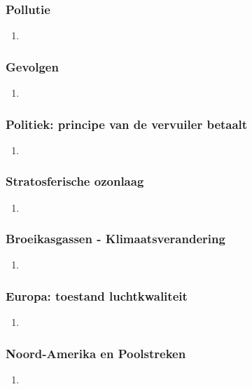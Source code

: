\documentclass[12pt]{article}
\begin{document}
    \subsubsection{Pollutie}
    \begin{enumerate}
        \item 
    \end{enumerate}

    \subsubsection{Gevolgen}
    \begin{enumerate}
        \item 
    \end{enumerate}

    \subsubsection{Politiek: principe van de vervuiler betaalt}
    \begin{enumerate}
        \item 
    \end{enumerate}

    \subsubsection{Stratosferische ozonlaag}
    \begin{enumerate}
        \item 
    \end{enumerate}

    \subsubsection{Broeikasgassen - Klimaatsverandering}
    \begin{enumerate}
        \item 
    \end{enumerate}

    \subsubsection{Europa: toestand luchtkwaliteit}
    \begin{enumerate}
        \item 
    \end{enumerate}

    \subsubsection{Noord-Amerika en Poolstreken}
    \begin{enumerate}
        \item 
    \end{enumerate}
\end{document}
